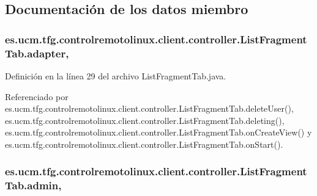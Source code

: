\subsection{Documentación de los datos miembro}
\hypertarget{classes_1_1ucm_1_1tfg_1_1controlremotolinux_1_1client_1_1controller_1_1ListFragmentTab_ad6f6b69881ec2d4ccf4db2d0ce1dd2fa}{
\subsubsection[{adapter}]{ es.\-ucm.\-tfg.\-controlremotolinux.\-client.\-controller.\-List\-Fragment\-Tab.\-adapter\hspace{0.3cm}{\ttfamily [static]}, {\ttfamily [private]}}}\label{classes_1_1ucm_1_1tfg_1_1controlremotolinux_1_1client_1_1controller_1_1ListFragmentTab_ad6f6b69881ec2d4ccf4db2d0ce1dd2fa}


Definición en la línea 29 del archivo List\-Fragment\-Tab.\-java.



Referenciado por es.\-ucm.\-tfg.\-controlremotolinux.\-client.\-controller.\-List\-Fragment\-Tab.\-delete\-User(), es.\-ucm.\-tfg.\-controlremotolinux.\-client.\-controller.\-List\-Fragment\-Tab.\-deleting(), es.\-ucm.\-tfg.\-controlremotolinux.\-client.\-controller.\-List\-Fragment\-Tab.\-on\-Create\-View() y es.\-ucm.\-tfg.\-controlremotolinux.\-client.\-controller.\-List\-Fragment\-Tab.\-on\-Start().

\hypertarget{classes_1_1ucm_1_1tfg_1_1controlremotolinux_1_1client_1_1controller_1_1ListFragmentTab_a33e0f726fe8db5a3feef992a2ce2181b}{
\subsubsection[{admin}]{ es.\-ucm.\-tfg.\-controlremotolinux.\-client.\-controller.\-List\-Fragment\-Tab.\-admin\hspace{0.3cm}{\ttfamily [static]}, {\ttfamily [private]}}}\label{classes_1_1ucm_1_1tfg_1_1controlremotolinux_1_1client_1_1controller_1_1ListFragmentTab_a33e0f726fe8db5a3feef992a2ce2181b}


